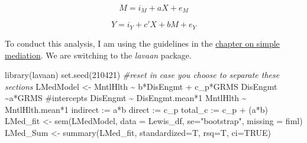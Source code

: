 \documentclass[
]{book}
\newenvironment{Shaded}{\begin{snugshade}}{\end{snugshade}}
\newcommand{\AttributeTok}[1]{\textcolor[rgb]{0.77,0.63,0.00}{#1}}
\newcommand{\CommentTok}[1]{\textcolor[rgb]{0.56,0.35,0.01}{\textit{#1}}}
\newcommand{\ConstantTok}[1]{\textcolor[rgb]{0.00,0.00,0.00}{#1}}
\newcommand{\DecValTok}[1]{\textcolor[rgb]{0.00,0.00,0.81}{#1}}
\newcommand{\FunctionTok}[1]{\textcolor[rgb]{0.00,0.00,0.00}{#1}}
\newcommand{\NormalTok}[1]{#1}
\newcommand{\OtherTok}[1]{\textcolor[rgb]{0.56,0.35,0.01}{#1}}
\newcommand{\StringTok}[1]{\textcolor[rgb]{0.31,0.60,0.02}{#1}}
\begin{document}
\[M = i_{M}+aX + e_{M}\]

\[Y = i_{Y}+c'X+ bM+e_{Y}\]

To conduct this analysis, I am using the guidelines in the \protect\hyperlink{SimpleMed}{chapter on simple mediation}. We are switching to the \emph{lavaan} package.

\begin{Shaded}
\begin{Highlighting}[]
\FunctionTok{library}\NormalTok{(lavaan)}
\FunctionTok{set.seed}\NormalTok{(}\DecValTok{210421}\NormalTok{) }\CommentTok{\#reset in case you choose to separate these sections}
\NormalTok{LMedModel }\OtherTok{\textless{}{-}} \StringTok{\textquotesingle{}}
\StringTok{          MntlHlth \textasciitilde{} b*DisEngmt + c\_p*GRMS }
\StringTok{          DisEngmt \textasciitilde{}a*GRMS}
\StringTok{          }
\StringTok{          \#intercepts}
\StringTok{          DisEngmt \textasciitilde{} DisEngmt.mean*1}
\StringTok{          MntlHlth \textasciitilde{} MntlHlth.mean*1}
\StringTok{          }
\StringTok{          indirect :=  a*b}
\StringTok{          direct  := c\_p}
\StringTok{          total\_c  := c\_p + (a*b)}
\StringTok{          \textquotesingle{}}
\NormalTok{LMed\_fit }\OtherTok{\textless{}{-}} \FunctionTok{sem}\NormalTok{(LMedModel, }\AttributeTok{data =}\NormalTok{ Lewis\_df, }\AttributeTok{se=}\StringTok{"bootstrap"}\NormalTok{, }\AttributeTok{missing =} \StringTok{\textquotesingle{}fiml\textquotesingle{}}\NormalTok{)}
\NormalTok{LMed\_Sum }\OtherTok{\textless{}{-}}  \FunctionTok{summary}\NormalTok{(LMed\_fit, }\AttributeTok{standardized=}\NormalTok{T, }\AttributeTok{rsq=}\NormalTok{T, }\AttributeTok{ci=}\ConstantTok{TRUE}\NormalTok{)}
\end{Highlighting}
\end{Shaded}
\end{document}
